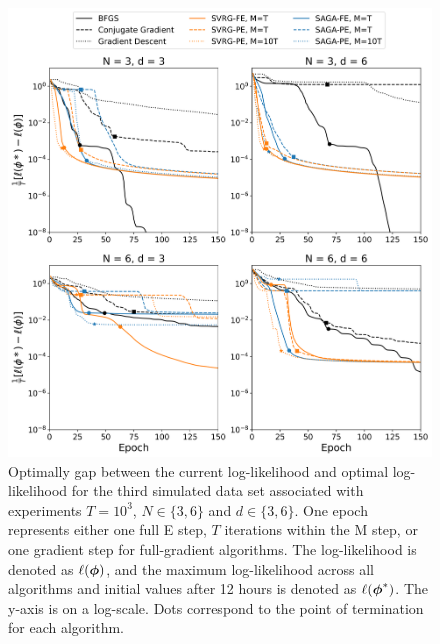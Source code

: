 \documentclass[12pt]{article}
\begin{document}
\begin{figure}[H]
    \centering
    \includegraphics[width=6.5in]{../plt/log-like_v_epoch_T-1000-002.png}
    \caption{Optimally gap between the current log-likelihood and optimal log-likelihood for the third simulated data set associated with experiments $T=10^{3}$, $N \in \{3,6\}$ and $d \in \{3,6\}$. One epoch represents either one full E step, $T$ iterations within the M step, or one gradient step for full-gradient algorithms. The log-likelihood is denoted as $\ell(\boldsymbol{\phi})$, and the maximum log-likelihood across all algorithms and initial values after 12 hours is denoted as $\ell(\boldsymbol{\phi}^*)$. The y-axis is on a log-scale. Dots correspond to the point of termination for each algorithm.}
\end{figure}
%
\end{document}
